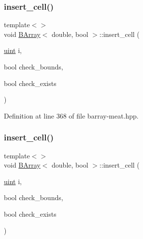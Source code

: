 \mbox{\label{class_b_array_a65aaf8f78714cd94616cf826b3eef6e1}} 
\subsubsection{\texorpdfstring{insert\+\_\+cell()}{insert\_cell()}\hspace{0.1cm}{\footnotesize\ttfamily [7/10]}}
{\footnotesize\ttfamily template$<$$>$ \\
void \hyperlink{class_b_array}{B\+Array}$<$ double, bool $>$\+::insert\+\_\+cell (\begin{DoxyParamCaption}\item[{\hyperlink{typedefs_8hpp_a91ad9478d81a7aaf2593e8d9c3d06a14}{uint}}]{i,  }\item[{bool}]{check\+\_\+bounds,  }\item[{bool}]{check\+\_\+exists }\end{DoxyParamCaption})\hspace{0.3cm}{\ttfamily [inline]}}



Definition at line 368 of file barray-\/meat.\+hpp.

\mbox{\label{class_b_array_a65aaf8f78714cd94616cf826b3eef6e1}} 
\subsubsection{\texorpdfstring{insert\+\_\+cell()}{insert\_cell()}\hspace{0.1cm}{\footnotesize\ttfamily [8/10]}}
{\footnotesize\ttfamily template$<$$>$ \\
void \hyperlink{class_b_array}{B\+Array}$<$ double, bool $>$\+::insert\+\_\+cell (\begin{DoxyParamCaption}\item[{\hyperlink{typedefs_8hpp_a91ad9478d81a7aaf2593e8d9c3d06a14}{uint}}]{i,  }\item[{bool}]{check\+\_\+bounds,  }\item[{bool}]{check\+\_\+exists }\end{DoxyParamCaption})\hspace{0.3cm}{\ttfamily [inline]}}




